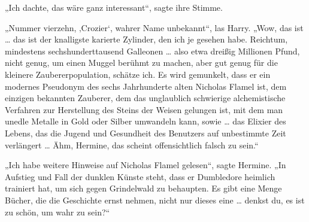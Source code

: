 „Ich dachte, das wäre ganz interessant“, sagte ihre Stimme.

„Nummer vierzehn, ‚Crozier‘, wahrer Name unbekannt“, las Harry.
„Wow, das ist … das ist der knalligste karierte Zylinder, den ich je gesehen habe. Reichtum, mindestens sechshunderttausend Galleonen … also etwa dreißig Millionen Pfund, nicht genug, um einen Muggel berühmt zu machen, aber gut genug für die kleinere Zaubererpopulation, schätze ich. Es wird gemunkelt, dass er ein modernes Pseudonym des sechs Jahrhunderte alten Nicholas Flamel ist, dem einzigen bekannten Zauberer, dem das unglaublich schwierige alchemistische Verfahren zur Herstellung des Steins der Weisen gelungen ist, mit dem man unedle Metalle in Gold oder Silber umwandeln kann, sowie … das Elixier des Lebens, das die Jugend und Gesundheit des Benutzers auf unbestimmte Zeit verlängert … Ähm, Hermine, das scheint offensichtlich falsch zu sein.“

„Ich habe weitere Hinweise auf Nicholas Flamel gelesen“, sagte Hermine.
„In Aufstieg und Fall der dunklen Künste steht, dass er Dumbledore heimlich trainiert hat, um sich gegen Grindelwald zu behaupten. Es gibt eine Menge Bücher, die die Geschichte ernst nehmen, nicht nur dieses eine … denkst du, es ist zu schön, um wahr zu sein?“

